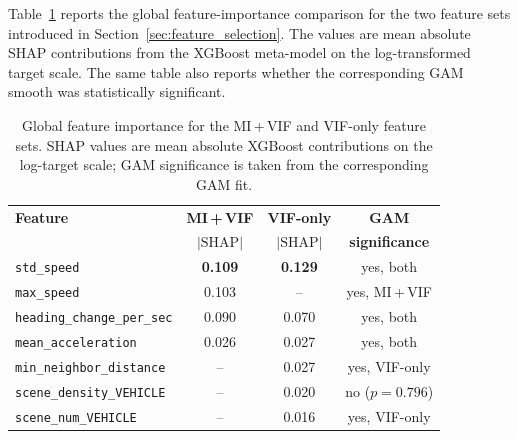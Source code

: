 \documentclass[12pt]{article}
\begin{document}
Table~\ref{tab:feature_effect_importance} reports the global feature-importance comparison for the two feature sets introduced in Section~\ref{sec:feature_selection}. The values are mean absolute SHAP contributions from the XGBoost meta-model on the log-transformed target scale. The same table also reports whether the corresponding GAM smooth was statistically significant.

\begin{table}[H]
  \centering
  \caption[Global feature importance for both feature sets]{Global feature importance for the MI\,+\,VIF and VIF-only feature sets. SHAP values are mean absolute XGBoost contributions on the log-target scale; GAM significance is taken from the corresponding GAM fit.}
  \label{tab:feature_effect_importance}
  \small
  \renewcommand{\arraystretch}{1.12}
  \begin{tabular}{@{}lccc@{}}
    \toprule
    \textbf{Feature} & \textbf{MI\,+\,VIF} & \textbf{VIF-only} & \textbf{GAM} \\
    & $|\mathrm{SHAP}|$ & $|\mathrm{SHAP}|$ & \textbf{significance} \\
    \midrule
    \texttt{std\_speed}                & \textbf{0.109} & \textbf{0.129} & yes, both \\
    \texttt{max\_speed}                & 0.103          & --             & yes, MI\,+\,VIF \\
    \texttt{heading\_change\_per\_sec} & 0.090          & 0.070          & yes, both \\
    \texttt{mean\_acceleration}        & 0.026          & 0.027          & yes, both \\
    \midrule
    \texttt{min\_neighbor\_distance}   & --             & 0.027          & yes, VIF-only \\
    \texttt{scene\_density\_VEHICLE}   & --             & 0.020          & no ($p=0.796$) \\
    \texttt{scene\_num\_VEHICLE}       & --             & 0.016          & yes, VIF-only \\
    \bottomrule
  \end{tabular}
\end{table}
\end{document}
